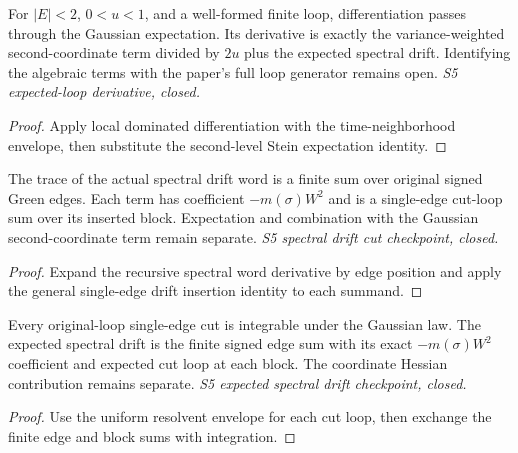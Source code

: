 \begin{lemma}
  \label{lem:loop-expectation-derivative}
  \leanok
  For $|E|<2$, $0<u<1$, and a well-formed finite loop, differentiation
  passes through the Gaussian expectation. Its derivative is exactly the
  variance-weighted second-coordinate term divided by $2u$ plus the
  expected spectral drift. Identifying the algebraic terms with the paper's
  full loop generator remains open. \emph{S5 expected-loop derivative, closed.}
\end{lemma}
\begin{proof}\leanok
  Apply local dominated differentiation with the time-neighborhood envelope,
  then substitute the second-level Stein expectation identity.
\end{proof}

\begin{lemma}
  \label{lem:loop-spectral-drift-cuts}
  \leanok
  The trace of the actual spectral drift word is a finite sum over original
  signed Green edges. Each term has coefficient
  $-m(\sigma)W^2$ and is a single-edge cut-loop sum over its inserted block.
  Expectation and combination with the Gaussian second-coordinate term
  remain separate. \emph{S5 spectral drift cut checkpoint, closed.}
\end{lemma}
\begin{proof}\leanok
  Expand the recursive spectral word derivative by edge position and apply
  the general single-edge drift insertion identity to each summand.
\end{proof}

\begin{lemma}
  \label{lem:loop-spectral-drift-expectation}
  \leanok
  Every original-loop single-edge cut is integrable under the Gaussian
  law. The expected spectral drift is the finite signed edge sum with its
  exact $-m(\sigma)W^2$ coefficient and expected cut loop at each block.
  The coordinate Hessian contribution remains separate.
  \emph{S5 expected spectral drift checkpoint, closed.}
\end{lemma}
\begin{proof}\leanok
  Use the uniform resolvent envelope for each cut loop, then exchange
  the finite edge and block sums with integration.
\end{proof}


